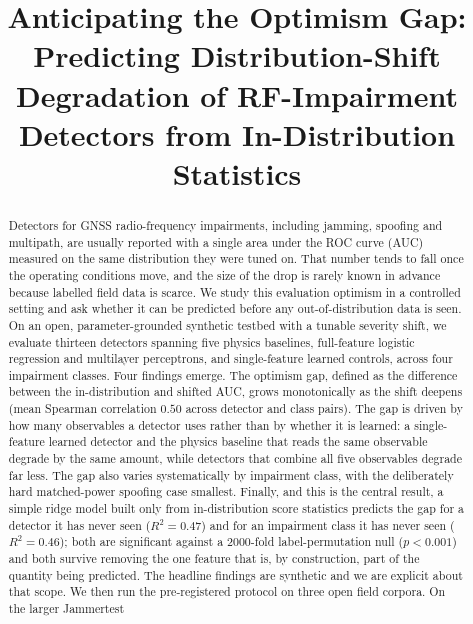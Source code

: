 \documentclass[conference]{IEEEtran}
\begin{document}
\title{Anticipating the Optimism Gap: Predicting Distribution-Shift Degradation
of RF-Impairment Detectors from In-Distribution Statistics}

\author{
}

\maketitle

\begin{abstract}
Detectors for GNSS radio-frequency impairments, including jamming, spoofing and
multipath, are usually reported with a single area under the ROC curve (AUC)
measured on the same distribution they were tuned on. That number tends to fall
once the operating conditions move, and the size of the drop is rarely known in
advance because labelled field data is scarce. We study this evaluation optimism
in a controlled setting and ask whether it can be predicted before any
out-of-distribution data is seen. On an open, parameter-grounded synthetic
testbed with a tunable severity shift, we evaluate thirteen detectors spanning
five physics baselines, full-feature logistic regression and multilayer
perceptrons, and single-feature learned controls, across four impairment classes.
Four findings emerge. The optimism gap, defined as the difference between the
in-distribution and shifted AUC, grows monotonically as the shift deepens (mean
Spearman correlation $0.50$ across detector and class pairs). The gap is driven by
how many observables a detector uses rather than by whether it is learned: a
single-feature learned detector and the physics baseline that reads the same
observable degrade by the same amount, while detectors that combine all five
observables degrade far less. The gap also varies systematically by impairment
class, with the deliberately hard matched-power spoofing case smallest. Finally,
and this is the central result, a simple ridge model built only from
in-distribution score statistics predicts the gap for a detector it has never seen
($R^2 = 0.47$) and for an impairment class it has never seen ($R^2 = 0.46$); both
are significant against a 2000-fold label-permutation null ($p < 0.001$) and both
survive removing the one feature that is, by construction, part of the quantity
being predicted. The headline findings are synthetic and we are explicit about that scope. We then
run the pre-registered protocol on three open field corpora. On the larger Jammertest

\end{abstract}
\end{document}

